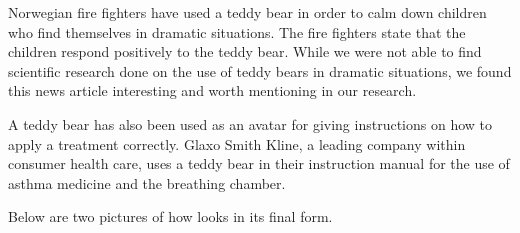 Norwegian fire fighters have used a teddy bear in order to calm down children who find themselves in dramatic situations. The fire fighters state that the children respond positively to the teddy bear. 
While we were not able to find scientific research done on the use of teddy bears in dramatic situations, we found this news article interesting and worth mentioning in our research. 

A teddy bear has also been used as an avatar for giving instructions on how to apply a treatment correctly. Glaxo Smith Kline, a leading company within consumer health care, uses a teddy bear in their instruction manual for the use of asthma medicine and the breathing chamber\cite{glaxosmithkline}. 

Below are two pictures of how \ab{} looks in its final form. 

